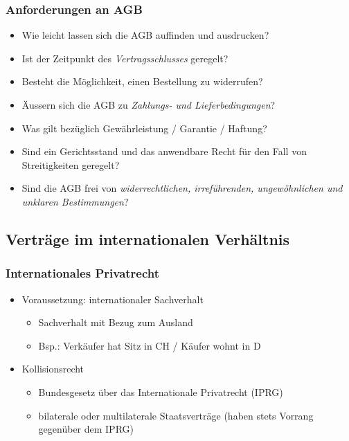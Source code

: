 \subsubsection{Anforderungen an AGB}
\begin{itemize}
    \item Wie leicht lassen sich die AGB auffinden und ausdrucken?
    \item Ist der Zeitpunkt des \textit{Vertragsschlusses} geregelt?
    \item Besteht die Möglichkeit, einen Bestellung zu widerrufen?
    \item Äussern sich die AGB zu \textit{Zahlungs- und Lieferbedingungen}?
    \item Was gilt bezüglich Gewährleistung / Garantie / Haftung?
    \item Sind ein Gerichtsstand und das anwendbare Recht für den Fall von Streitigkeiten geregelt?
    \item Sind die AGB frei von \textit{widerrechtlichen, irreführenden, ungewöhnlichen und unklaren Bestimmungen}?
\end{itemize}

\subsection{Verträge im internationalen Verhältnis}

\subsubsection{Internationales Privatrecht}
\begin{itemize}
    \item Voraussetzung: internationaler Sachverhalt
    \begin{itemize}
        \item Sachverhalt mit Bezug zum Ausland
        \item Bsp.: Verkäufer hat Sitz in CH / Käufer wohnt in D
    \end{itemize}
    \item Kollisionsrecht
    \begin{itemize}
        \item Bundesgesetz über das Internationale Privatrecht (IPRG)
        \item bilaterale oder multilaterale Staatsverträge (haben stets Vorrang gegenüber dem IPRG)
    \end{itemize}
\end{itemize}